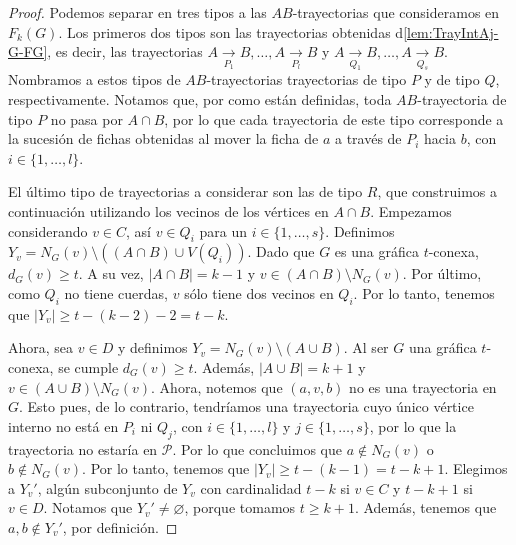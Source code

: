 \begin{proof}
    Podemos separar en tres tipos a las $AB$-trayectorias que consideramos en
    $F_{k}(G)$. Los primeros dos tipos son las trayectorias obtenidas
    d\cref{lem:TrayIntAj-G-FG}, es decir, las trayectorias $A
    \xrightarrow[P_1]{}  B, \dots, A \xrightarrow[P_l]{}  B$ y $A
    \xrightarrow[Q_1]{}  B, \dots, A \xrightarrow[Q_s]{}  B$. Nombramos a estos
    tipos de $AB$-trayectorias trayectorias de tipo $P$ y de tipo $Q$,
    respectivamente. Notamos que, por como est\'an definidas, toda
    $AB$-trayectoria de tipo $P$ no pasa por $A\cap B$, por lo que cada
    trayectoria de este tipo corresponde a la sucesi\'on de fichas obtenidas al
    mover la ficha de $a$ a trav\'es de $P_i$ hacia $b$, con $i \in \{1, \dots,
    l\}$.
    
    El \'ultimo tipo de trayectorias a considerar son las de tipo $R$, que
    construimos a continuaci\'on utilizando los vecinos de los v\'ertices en $A
    \cap B$. Empezamos considerando $v \in C$, as\'i $v \in Q_i$ para un $i \in
    \{1, \dots, s\}$. Definimos $Y_v = N_G(v) \setminus ((A \cap B) \cup
    V(Q_i))$. Dado que $G$ es una gr\'afica $t$-conexa, $d_G(v) \geq t$. A su
    vez, $|A \cap B| =k -1$ y $v \in (A \cap B) \setminus N_G(v)$. Por \'ultimo,
    como $Q_i$ no tiene cuerdas, $v$ s\'olo tiene dos vecinos en $Q_i$. Por lo
    tanto, tenemos que $|Y_v| \geq t- (k-2)-2 = t-k$. 
    
    Ahora, sea $v \in D$ y definimos $Y_v = N_G(v) \setminus (A \cup B)$. Al ser
    $G$ una gr\'afica $t$-conexa, se cumple $d_G(v) \geq t$. Adem\'as, $|A \cup
    B| = k + 1$ y $v \in (A \cup B) \setminus N_G(v)$. Ahora, notemos que $(a,
    v, b)$ no es una trayectoria en $G$. Esto pues, de lo contrario,
    tendr\'iamos una trayectoria cuyo \'unico v\'ertice interno no est\'a en
    $P_i$ ni $Q_j$, con $i \in \{1, \dots, l\}$ y $j \in \{1, \dots, s\}$, por
    lo que la trayectoria no estar\'ia en $\mathcal{P}$. Por lo que concluimos
    que $a \notin N_G(v)$ o $b \notin N_G(v)$. Por lo tanto, tenemos que $|Y_v|
    \geq t- (k-1) = t-k + 1$. Elegimos a $Y_v '$, alg\'un subconjunto de $Y_v$
    con cardinalidad $t-k$ si $v \in C$ y $t- k+ 1$ si $v \in D$. Notamos que
    $Y_v ' \neq \varnothing$, porque tomamos $t \geq k + 1$. Adem\'as, tenemos
    que $a, b \notin Y_v '$, por definici\'on. 


\end{proof}
